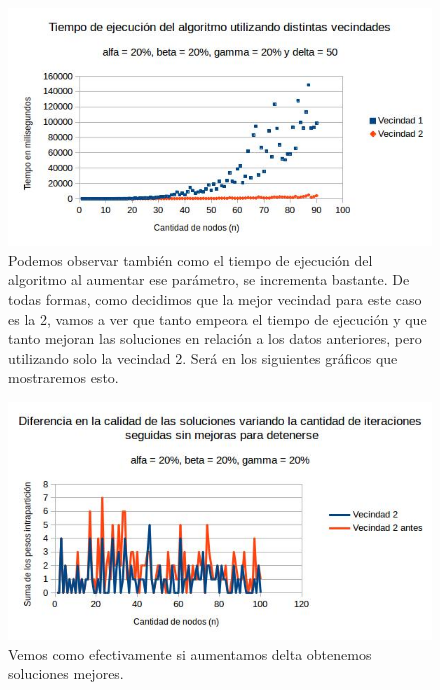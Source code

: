 \documentclass[a4paper]{article}
\begin{document}
\begin{figure}[H]
\centering
\includegraphics[scale=0.7]{20202050c.jpg}\caption{Podemos observar también como el tiempo de ejecución del algoritmo al aumentar ese parámetro, se incrementa bastante. De todas formas, como decidimos que la mejor vecindad para este caso es la 2, vamos a ver que tanto empeora el tiempo de ejecución y que tanto mejoran las soluciones en relación a los datos anteriores, pero utilizando solo la vecindad 2. Será en los siguientes gráficos que mostraremos esto.}
\end{figure}

\begin{figure}[H]
\centering
\includegraphics[scale=0.7]{20202020difcal.jpg}\caption{Vemos como efectivamente si aumentamos delta obtenemos soluciones mejores.}
\end{figure}
\end{document}
